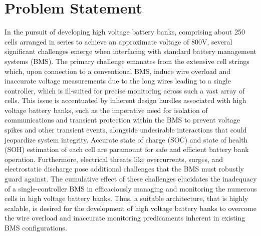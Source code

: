 \section{Problem Statement}\label{sec:probState} %
In the pursuit of developing high voltage battery banks, comprising about 250 cells arranged in series to achieve an approximate voltage of 800V, several significant challenges emerge when interfacing with standard battery management systems (BMS). The primary challenge emanates from the extensive cell strings which, upon connection to a conventional BMS, induce wire overload and inaccurate voltage measurements due to the long wires leading to a single controller, which is ill-suited for precise monitoring across such a vast array of cells.\newline\newline
\noindent
This issue is accentuated by inherent design hurdles associated with high voltage battery banks, such as the imperative need for isolation of communications and transient protection within the BMS to prevent voltage spikes and other transient events, alongside undesirable interactions that could jeopardize system integrity. Accurate state of charge (SOC) and state of health (SOH) estimation of each cell are paramount for safe and efficient battery bank operation.\newline\newline
\noindent
Furthermore, electrical threats like overcurrents, surges, and electrostatic discharge pose additional challenges that the BMS must robustly guard against. The cumulative effect of these challenges elucidates the inadequacy of a single-controller BMS in efficaciously managing and monitoring the numerous cells in high voltage battery banks. Thus, a suitable architecture, that is highly scalable, is desired for the development of high voltage battery banks to overcome the wire overload and inaccurate monitoring predicaments inherent in existing BMS configurations.
